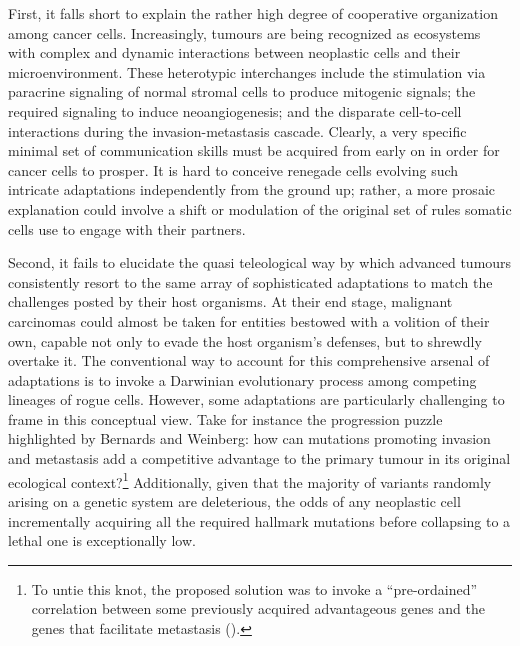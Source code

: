 First, it falls short to explain the rather high degree of cooperative
organization among cancer cells.  Increasingly, tumours are being recognized as
ecosystems with complex and dynamic interactions between neoplastic cells and
their microenvironment.\cite{polyak_co-evolution_2009} These heterotypic
interchanges include the stimulation via paracrine signaling of normal stromal
cells to produce mitogenic signals; the required signaling to induce
neoangiogenesis; and the disparate cell-to-cell interactions during the
invasion-metastasis cascade.\cite{axelrod_evolution_2006} Clearly, a very
specific minimal set of communication skills must be acquired from early on in
order for cancer cells to prosper.  It is hard to conceive renegade cells
evolving such intricate adaptations independently from the ground up; rather, a
more prosaic explanation could involve a shift or modulation of the original set
of rules somatic cells use to engage with their partners.

Second, it fails to elucidate the quasi teleological way by which advanced
tumours consistently resort to the same array of sophisticated
adaptations\cite{hanahan_hallmarks_2011} to match the challenges posted by their
host organisms.  At their end stage, malignant carcinomas could almost be taken
for entities bestowed with a volition of their own, capable not only to evade
the host organism's defenses, but to shrewdly overtake it.  The conventional way
to account for this comprehensive arsenal of adaptations is to invoke a
Darwinian evolutionary process among competing lineages of rogue
cells.\cite{merlo_cancer_2006} However, some adaptations are particularly
challenging to frame in this conceptual view.  Take for instance the progression
puzzle highlighted by Bernards and Weinberg: how can mutations promoting
invasion and metastasis add a competitive advantage to the primary tumour in its
original ecological context?\footnote{To untie this knot, the proposed solution
  was to invoke a ``pre-ordained'' correlation between some previously acquired
  advantageous genes and the genes that facilitate metastasis
  (\citealp{bernards_progression_2002}).}  Additionally, given that the majority
of variants randomly arising on a genetic system are deleterious, the odds of
any neoplastic cell incrementally acquiring all the required hallmark mutations
before collapsing to a lethal one is exceptionally low.

